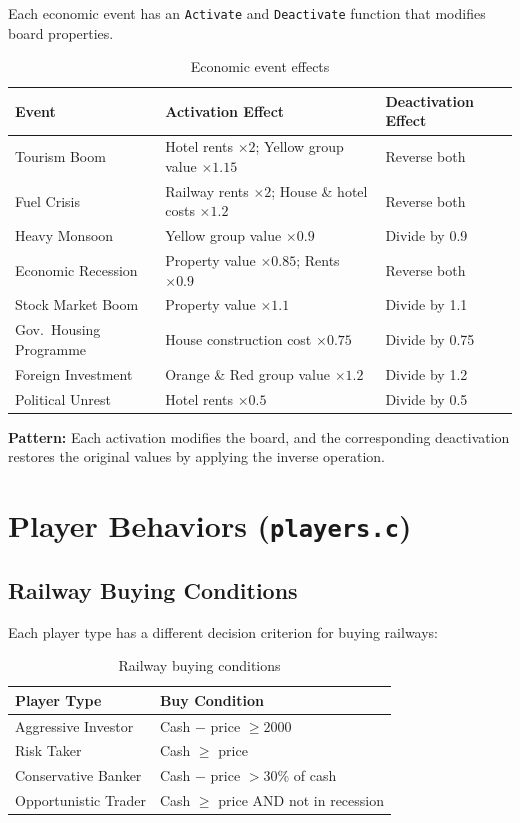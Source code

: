 \documentclass[12pt,a4paper]{article}
\begin{document}
Each economic event has an \texttt{Activate} and \texttt{Deactivate} function that modifies board properties.

\begin{table}[h]
\centering
\small
\begin{tabular}{p{3.5cm}p{5cm}p{5cm}}
\toprule
\textbf{Event} & \textbf{Activation Effect} & \textbf{Deactivation Effect} \\
\midrule
Tourism Boom & Hotel rents $\times 2$; Yellow group value $\times 1.15$ & Reverse both \\
Fuel Crisis & Railway rents $\times 2$; House \& hotel costs $\times 1.2$ & Reverse both \\
Heavy Monsoon & Yellow group value $\times 0.9$ & Divide by 0.9 \\
Economic Recession & Property value $\times 0.85$; Rents $\times 0.9$ & Reverse both \\
Stock Market Boom & Property value $\times 1.1$ & Divide by 1.1 \\
Gov.\ Housing Programme & House construction cost $\times 0.75$ & Divide by 0.75 \\
Foreign Investment & Orange \& Red group value $\times 1.2$ & Divide by 1.2 \\
Political Unrest & Hotel rents $\times 0.5$ & Divide by 0.5 \\
\bottomrule
\end{tabular}
\caption{Economic event effects}
\end{table}

\textbf{Pattern:} Each activation modifies the board, and the corresponding deactivation restores the original values by applying the inverse operation.

\newpage

\section{Player Behaviors (\texttt{players.c})}

\subsection{Railway Buying Conditions}

Each player type has a different decision criterion for buying railways:

\begin{table}[h]
\centering
\begin{tabular}{ll}
\toprule
\textbf{Player Type} & \textbf{Buy Condition} \\
\midrule
Aggressive Investor & Cash $-$ price $\geq 2000$ \\
Risk Taker & Cash $\geq$ price \\
Conservative Banker & Cash $-$ price $> 30\%$ of cash \\
Opportunistic Trader & Cash $\geq$ price AND not in recession \\
\bottomrule
\end{tabular}
\caption{Railway buying conditions}
\end{table}
\end{document}
